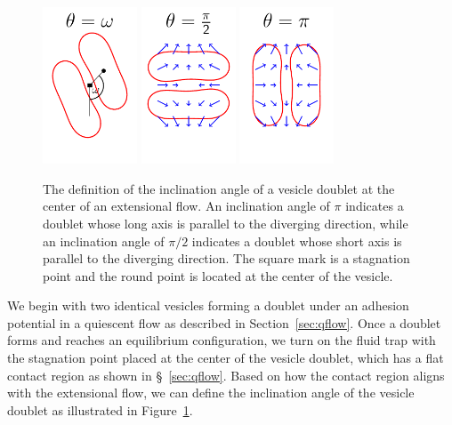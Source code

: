\documentclass[prf,superscriptaddress,showpacs]{revtex4-1}
\begin{document}
\begin{figure}[htp]
    \includegraphics[width=0.25\textwidth]{figs/angleDefinition.pdf}
    \includegraphics[width=0.25\textwidth]{figs/rotate1.pdf}
    \includegraphics[width=0.25\textwidth]{figs/rotate2.pdf}
   \caption{\label{fig:InclinationAngle} The definition of the
   inclination angle of a vesicle doublet at the center of an
   extensional flow.  An inclination angle of $\pi$ indicates a doublet
   whose long axis is parallel to the diverging direction, while an
   inclination angle of $\pi/2$ indicates a doublet whose short axis is
   parallel to the diverging direction.  The square mark is a stagnation
   point and the round point is located at the center of the vesicle.}
   \end{figure}

We begin with two identical vesicles forming a doublet under an
adhesion potential in a quiescent flow as described in
Section~\ref{sec:qflow}.  Once a doublet forms and reaches an
equilibrium configuration, we turn on the fluid trap with the stagnation
point placed at the center of the vesicle doublet, which has a flat contact region as shown in \S~\ref{sec:qflow}. 
Based on how the contact region aligns with the extensional flow, 
we can define the inclination angle of the vesicle doublet as illustrated in Figure~\ref{fig:InclinationAngle}.
%
\end{document}
